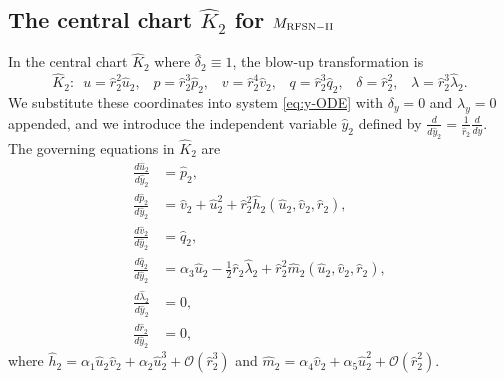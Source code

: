 \documentclass[11pt]{article}
\numberwithin{equation}{section}
\begin{document}
\subsection{The central chart \texorpdfstring{$\hat{K}_2$ for $M_{\rm RFSN-II}$}{Lg}} \label{sec:K2-RFSNII}
In the central chart $\hat{K}_2$ where $\hat{\delta}_2\equiv 1$, the blow-up transformation is
\begin{equation} \label{eq:K2-coords-RFSNII}
{\hat K}_2: \, \, \, 
  u = \hat{r}_2^2 \hat{u}_2, \, \, \,  \, \,
  p = \hat{r}_2^3 \hat{p}_2, \, \, \,  \, \, 
  v = \hat{r}_2^4 \hat{v}_2, \, \, \,  \,  \,
  q = \hat{r}_2^3 \hat{q}_2, \, \, \,  \, \, 
  \delta=\hat{r}_2^2, \, \, \, \, \, 
  \lambda=\hat{r}_2^3 \hat{\lambda}_2.
\end{equation}
We substitute these coordinates into system \eqref{eq:y-ODE} with $\delta_y=0$ and $\lambda_y= 0$ appended, and we introduce the independent variable $\hat{y}_2$ defined 
by $\frac{d}{d\hat{y}_2} = \frac{1}{\hat{r}_2} \frac{d}{dy}$.
The governing equations in $\hat{K}_2$ are
\begin{equation} \label{eq:K2-RFSNII}
\begin{split}
    \frac{d\hat{u}_2}{d\hat{y}_2} &= \hat{p}_2, \\ 
    \frac{d\hat{p}_2}{d\hat{y}_2} &= \hat{v}_2 + \hat{u}_2^2 + \hat{r}_2^2 \hat{h}_2(\hat{u}_2,\hat{v}_2,\hat{r}_2), \\
    \frac{d\hat{v}_2}{d\hat{y}_2} &= \hat{q}_2, \\
    \frac{d\hat{q}_2}{d\hat{y}_2} &= \alpha_3 \hat{u}_2  -\frac{1}{2}\hat{r}_2 \hat{\lambda}_2 + \hat{r}_2^2 \hat{m}_2(\hat{u}_2,\hat{v}_2,\hat{r}_2), \\
    \frac{d\hat{\lambda}_2}{d\hat{y}_2} &= 0 , \\
    \frac{d\hat{r}_2}{d\hat{y}_2} &= 0,
\end{split}
\end{equation}
where $\hat{h}_2= \alpha_1 \hat{u}_2 \hat{v}_2 + \alpha_2 \hat{u}_2^3 + \mathcal{O}(\hat{r}_2^3)$
and $\hat{m}_2=  \alpha_4 \hat{v}_2 + \alpha_5 \hat{u}_2^2 
+ \mathcal{O}(\hat{r}_2^2)$.
\end{document}
